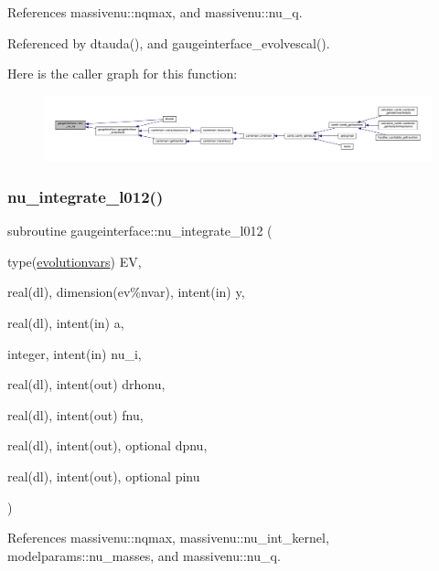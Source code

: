References massivenu\+::nqmax, and massivenu\+::nu\+\_\+q.



Referenced by dtauda(), and gaugeinterface\+\_\+evolvescal().

Here is the caller graph for this function\+:
\nopagebreak
\begin{figure}[H]
\begin{center}
\leavevmode
\includegraphics[width=350pt]{namespacegaugeinterface_ae317d979138ff46a65c14f787c0d749c_icgraph}
\end{center}
\end{figure}
\mbox{\label{namespacegaugeinterface_aaf5da349a1adc87f4c62f51f1e0c0371}} 
\subsubsection{\texorpdfstring{nu\+\_\+integrate\+\_\+l012()}{nu\_integrate\_l012()}}
{\footnotesize\ttfamily subroutine gaugeinterface\+::nu\+\_\+integrate\+\_\+l012 (\begin{DoxyParamCaption}\item[{type(\mbox{\hyperlink{structgaugeinterface_1_1evolutionvars}{evolutionvars}})}]{EV,  }\item[{real(dl), dimension(ev\%nvar), intent(in)}]{y,  }\item[{real(dl), intent(in)}]{a,  }\item[{integer, intent(in)}]{nu\+\_\+i,  }\item[{real(dl), intent(out)}]{drhonu,  }\item[{real(dl), intent(out)}]{fnu,  }\item[{real(dl), intent(out), optional}]{dpnu,  }\item[{real(dl), intent(out), optional}]{pinu }\end{DoxyParamCaption})}



References massivenu\+::nqmax, massivenu\+::nu\+\_\+int\+\_\+kernel, modelparams\+::nu\+\_\+masses, and massivenu\+::nu\+\_\+q.



